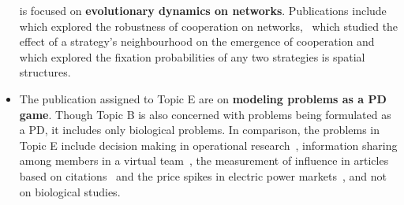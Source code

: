 \documentclass{article}
\theoremstyle{definition}
\begin{document}
\begin{itemize}
    is focused on \textbf{evolutionary dynamics on networks}. Publications include
    \cite{ichinose2013robustness} which explored the robustness of cooperation
    on networks,~\cite{wang2012spatial} which studied the effect of a strategy's neighbourhood
    on the emergence of cooperation and~\cite{chen2016fixation} which explored
    the fixation probabilities of any two strategies is spatial
    structures.
    \item The publication assigned to Topic E are on \textbf{modeling problems
    as a PD game}. Though Topic B is also concerned with problems being formulated
    as a PD, it includes only biological problems. In comparison, the problems
    in Topic E include decision making in
    operational research~\cite{ormerod2010or}, information sharing among members
    in a virtual team~\cite{feng2008trilateral}, the measurement of influence
    in articles based on citations~\cite{hutchins2016relative} and the price
    spikes in electric power markets~\cite{Guan2002}, and not on biological studies.
\end{itemize}
\end{document}
